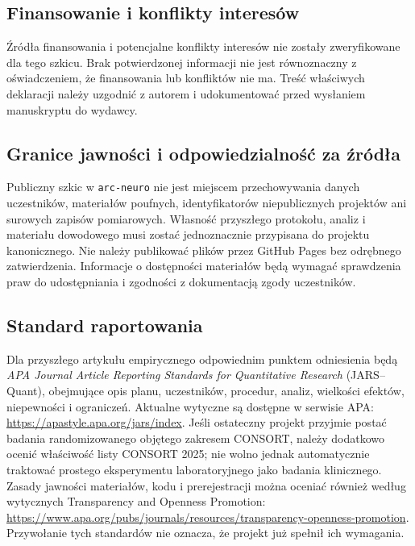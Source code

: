 \documentclass[11pt,a4paper]{article}
\begin{document}
\subsection*{Finansowanie i konflikty interesów}
Źródła finansowania i potencjalne konflikty interesów nie zostały zweryfikowane dla tego szkicu. Brak potwierdzonej informacji nie jest równoznaczny z oświadczeniem, że finansowania lub konfliktów nie ma. Treść właściwych deklaracji należy uzgodnić z autorem i udokumentować przed wysłaniem manuskryptu do wydawcy.

\subsection*{Granice jawności i odpowiedzialność za źródła}
Publiczny szkic w \texttt{arc-neuro} nie jest miejscem przechowywania danych uczestników, materiałów poufnych, identyfikatorów niepublicznych projektów ani surowych zapisów pomiarowych. Własność przyszłego protokołu, analiz i materiału dowodowego musi zostać jednoznacznie przypisana do projektu kanonicznego. Nie należy publikować plików przez GitHub Pages bez odrębnego zatwierdzenia. Informacje o dostępności materiałów będą wymagać sprawdzenia praw do udostępniania i zgodności z dokumentacją zgody uczestników.

\subsection*{Standard raportowania}
Dla przyszłego artykułu empirycznego odpowiednim punktem odniesienia będą \emph{APA Journal Article Reporting Standards for Quantitative Research} (JARS--Quant), obejmujące opis planu, uczestników, procedur, analiz, wielkości efektów, niepewności i ograniczeń. Aktualne wytyczne są dostępne w serwisie APA: \url{https://apastyle.apa.org/jars/index}. Jeśli ostateczny projekt przyjmie postać badania randomizowanego objętego zakresem CONSORT, należy dodatkowo ocenić właściwość listy CONSORT 2025; nie wolno jednak automatycznie traktować prostego eksperymentu laboratoryjnego jako badania klinicznego. Zasady jawności materiałów, kodu i prerejestracji można oceniać również według wytycznych Transparency and Openness Promotion: \url{https://www.apa.org/pubs/journals/resources/transparency-openness-promotion}. Przywołanie tych standardów nie oznacza, że projekt już spełnił ich wymagania.
\end{document}
